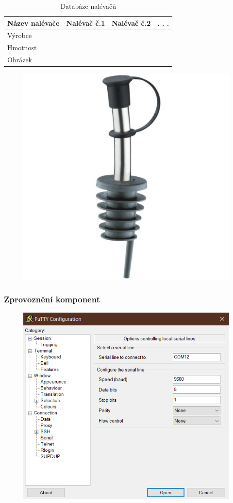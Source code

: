 \documentclass[%
  12pt,       				%
	t,                  %
	aspectratio=1610,   %
	unicode,						%
]{beamer}				    	%
\begin{document}
\begin{frame}[c] 
    \begin{table} [!h]
        \centering
        \begin{tabular}{|l|l|l|l|}
        \hline
             Název nalévače   & Nalévač č.1 & Nalévač č.2 &  . . .\\ \hline
             Výrobce &             &             &\\ \hline
             Hmotnost &             &             &\\ \hline
             Obrázek &             &             &\\ \hline
        \end{tabular}
        \caption{Databáze nalévačů}
        \label{tab:my_label}
    \end{table}

    \begin{figure}%
				\centering
				\includegraphics[width=0.3\columnwidth]{obrazky/nalévač.jpg}
			\end{figure}
    
\end{frame}

\begin{frame}[c] 
    \frametitle{Zprovoznění komponent}

    \begin{figure}%
				\centering
				\includegraphics[width=0.6\columnwidth]{obrazky/nastaveni putty.png}
			\end{figure}
    
\end{frame}
\end{document}
